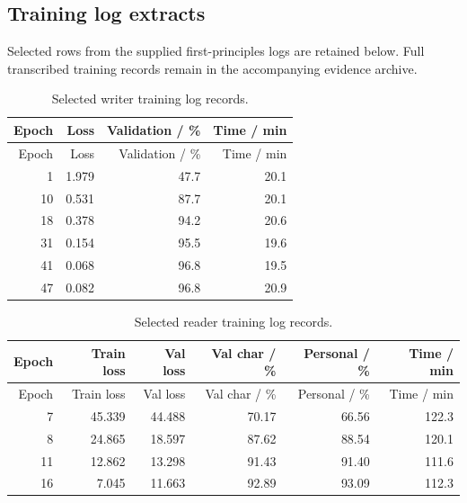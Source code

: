 \subsection{Training log extracts}\label{app:training-records}
Selected rows from the supplied first-principles logs are retained below. Full transcribed training records remain in the accompanying evidence archive.
\begin{longtable}{rrrr}
\caption{Selected writer training log records.}\label{tab:app-author-log}\\
\toprule Epoch & Loss & Validation / \% & Time / min\\\midrule\endfirsthead
\toprule Epoch & Loss & Validation / \% & Time / min\\\midrule\endhead
1 & 1.979 & 47.7 & 20.1\\
10 & 0.531 & 87.7 & 20.1\\
18 & 0.378 & 94.2 & 20.6\\
31 & 0.154 & 95.5 & 19.6\\
41 & 0.068 & 96.8 & 19.5\\
47 & 0.082 & 96.8 & 20.9\\
\bottomrule\end{longtable}
\begin{longtable}{rrrrrr}
\caption{Selected reader training log records.}\label{tab:app-reader-log}\\
\toprule Epoch & Train loss & Val loss & Val char / \% & Personal / \% & Time / min\\\midrule\endfirsthead
\toprule Epoch & Train loss & Val loss & Val char / \% & Personal / \% & Time / min\\\midrule\endhead
7 & 45.339 & 44.488 & 70.17 & 66.56 & 122.3\\
8 & 24.865 & 18.597 & 87.62 & 88.54 & 120.1\\
11 & 12.862 & 13.298 & 91.43 & 91.40 & 111.6\\
16 & 7.045 & 11.663 & 92.89 & 93.09 & 112.3\\
\bottomrule\end{longtable}
